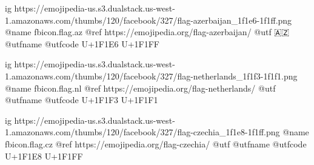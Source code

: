 	ig https://emojipedia-us.s3.dualstack.us-west-1.amazonaws.com/thumbs/120/facebook/327/flag-azerbaijan_1f1e6-1f1ff.png
	@name fbicon.flag.az
	@ref https://emojipedia.org/flag-azerbaijan/
	@utf 🇦🇿
	@utfname
	@utfcode U+1F1E6 U+1F1FF

	ig https://emojipedia-us.s3.dualstack.us-west-1.amazonaws.com/thumbs/120/facebook/327/flag-netherlands_1f1f3-1f1f1.png
	@name fbicon.flag.nl
	@ref https://emojipedia.org/flag-netherlands/
	@utf
	@utfname
	@utfcode  U+1F1F3 U+1F1F1

	ig https://emojipedia-us.s3.dualstack.us-west-1.amazonaws.com/thumbs/120/facebook/327/flag-czechia_1f1e8-1f1ff.png
	@name fbicon.flag.cz
	@ref https://emojipedia.org/flag-czechia/
	@utf
	@utfname
	@utfcode U+1F1E8 U+1F1FF
	
\fi
